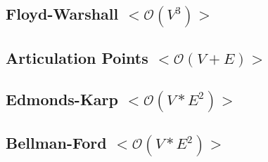 \documentclass[10pt, a4paper, twoside, notitlepage]{article}
\begin{document}


\subsection{Floyd-Warshall $<\mathcal{O}(V^{3})>$}



\newpage

\subsection{Articulation Points $<\mathcal{O}(V+E)>$}



\newpage

\subsection{Edmonds-Karp $<\mathcal{O}(V*E^{2})>$}



\newpage

\subsection{Bellman-Ford $<\mathcal{O}(V*E^{2})>$}



\newpage
\end{document}

